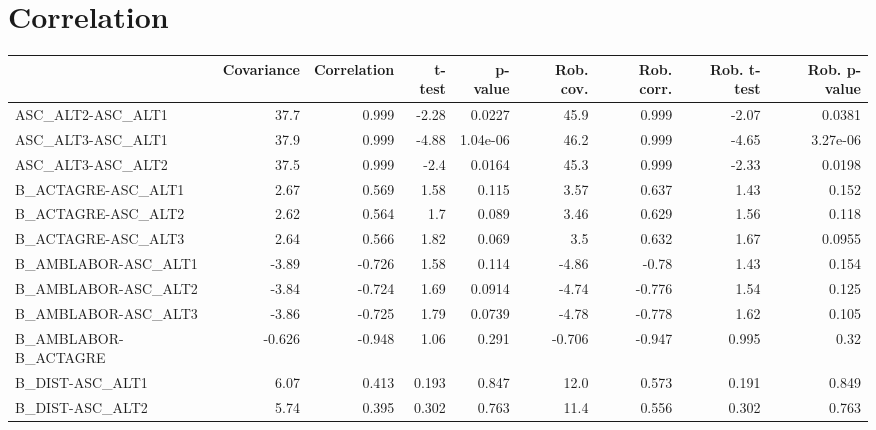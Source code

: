 \section{Correlation}
\begin{tabular}{lrrrrrrrr}
\toprule
{} &  Covariance &  Correlation &  t-test &  p-value &  Rob. cov. &  Rob. corr. &  Rob. t-test &  Rob. p-value \\
\midrule
ASC\_ALT2-ASC\_ALT1             &        37.7 &        0.999 &   -2.28 &   0.0227 &       45.9 &       0.999 &        -2.07 &        0.0381 \\
ASC\_ALT3-ASC\_ALT1             &        37.9 &        0.999 &   -4.88 & 1.04e-06 &       46.2 &       0.999 &        -4.65 &      3.27e-06 \\
ASC\_ALT3-ASC\_ALT2             &        37.5 &        0.999 &    -2.4 &   0.0164 &       45.3 &       0.999 &        -2.33 &        0.0198 \\
B\_ACTAGRE-ASC\_ALT1            &        2.67 &        0.569 &    1.58 &    0.115 &       3.57 &       0.637 &         1.43 &         0.152 \\
B\_ACTAGRE-ASC\_ALT2            &        2.62 &        0.564 &     1.7 &    0.089 &       3.46 &       0.629 &         1.56 &         0.118 \\
B\_ACTAGRE-ASC\_ALT3            &        2.64 &        0.566 &    1.82 &    0.069 &        3.5 &       0.632 &         1.67 &        0.0955 \\
B\_AMBLABOR-ASC\_ALT1           &       -3.89 &       -0.726 &    1.58 &    0.114 &      -4.86 &       -0.78 &         1.43 &         0.154 \\
B\_AMBLABOR-ASC\_ALT2           &       -3.84 &       -0.724 &    1.69 &   0.0914 &      -4.74 &      -0.776 &         1.54 &         0.125 \\
B\_AMBLABOR-ASC\_ALT3           &       -3.86 &       -0.725 &    1.79 &   0.0739 &      -4.78 &      -0.778 &         1.62 &         0.105 \\
B\_AMBLABOR-B\_ACTAGRE          &      -0.626 &       -0.948 &    1.06 &    0.291 &     -0.706 &      -0.947 &        0.995 &          0.32 \\
B\_DIST-ASC\_ALT1               &        6.07 &        0.413 &   0.193 &    0.847 &       12.0 &       0.573 &        0.191 &         0.849 \\
B\_DIST-ASC\_ALT2               &        5.74 &        0.395 &   0.302 &    0.763 &       11.4 &       0.556 &        0.302 &         0.763 \\

\end{tabular}
